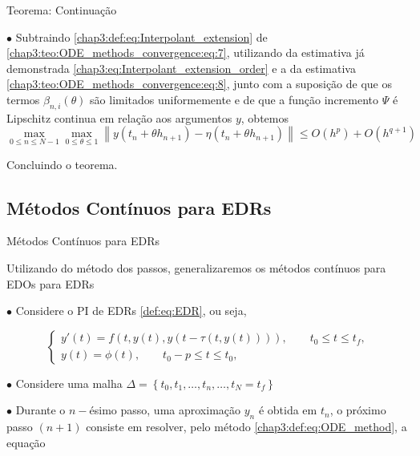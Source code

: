 \documentclass{beamer}
\theoremstyle{plain}
\theoremstyle{definition}
\begin{document}

\begin{frame}{Teorema: Continuação}

    \phantom{aa} $\bullet$  Subtraindo \eqref{chap3:def:eq:Interpolant_extension} de \eqref{chap3:teo:ODE_methods_convergence:eq:7}, utilizando da estimativa já demonstrada \eqref{chap3:eq:Interpolant_extension_order} e a da estimativa \eqref{chap3:teo:ODE_methods_convergence:eq:8}, junto com a suposição de que os termos \(\beta_{n, i}(\theta)\) são limitados uniformemente e de que a função incremento \(\Psi\) é Lipschitz continua em relação aos argumentos \(y\), obtemos
    \[
      \max _{0 \leq n \leq N-1} \max _{0 \leq \theta \leq 1}\left\|y\left(t_{n}+\theta h_{n+1}\right)-\eta\left(t_{n}+\theta h_{n+1}\right)\right\| \leq O\left(h^{p}\right)+O\left(h^{q+1}\right)
    \]

    \noindent 
     Concluindo o teorema.
\end{frame}



\subsection{Métodos Contínuos para EDRs}

\begin{frame}{Métodos Contínuos para EDRs}

    Utilizando do método dos passos, generalizaremos os métodos contínuos para EDOs para EDRs

    \phantom{aa} $\bullet$ Considere o PI de EDRs \eqref{def:eq:EDR}, ou seja,

    \begin{equation}
        \begin{cases}
            y'(t) = f(t, y(t), y(t - \tau(t, y(t)))), \qquad t_0 \leq t \leq t_f , \\
            y(t) = \phi(t), \qquad t_0 - p \leq t \leq t_0,
        \end{cases}
        \label{chap3:def:EDR}
    \end{equation}


    \phantom{aa} $\bullet$ Considere uma malha \(\Delta=\left\{t_{0}, t_{1}, \ldots, t_{n}, \ldots\right., \left.t_{N}=t_{f}\right\}\) 


    \phantom{aa} $\bullet$ Durante o $n-$ésimo passo, uma aproximação \( y_{n} \) é obtida em \( t_{n} \), o próximo passo \((n+1)\) consiste em resolver, pelo método \ref{chap3:def:eq:ODE_method}, a equação



\end{frame}
\end{document}
